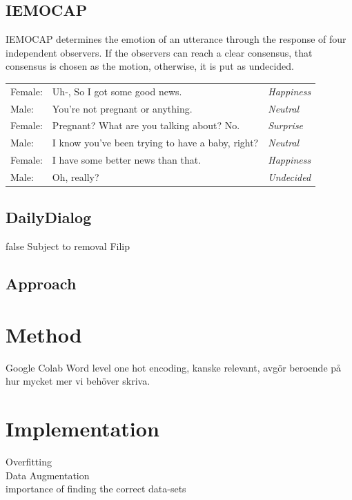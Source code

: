 \documentclass[nofilelist]{cslthse-msc}
\begin{document}
\subsection{IEMOCAP}
IEMOCAP determines the emotion of an utterance through the response of four independent observers. If the observers can reach a clear consensus, that consensus is chosen as the motion, otherwise, it is put as undecided. 

\begin{table}[!ht]
    \begin{pag}

    \centering
    \begin{tabular}{lll}
Female: & Uh-, So I got some good news. & \textit{Happiness} \\
Male: & You're not pregnant or anything. & \textit{Neutral} \\
Female: & Pregnant? What are you talking about? No. & \textit{Surprise} \\
Male: & I know you've been trying to have a baby, right? & \textit{Neutral} \\
Female: & I have some better news than that. & \textit{Happiness} \\
Male: & Oh, really? & \textit{Undecided} \\
    \end{tabular}
    \label{tab:dialogue_iemocap}
\end{pag}
\end{table}


\subsection{DailyDialog}







\ifx false
Subject to removal
Filip
\subsection{Approach} 
\section{Method}
Google Colab
Word level one hot encoding, kanske relevant, avgör beroende på hur mycket mer vi behöver skriva.
\section{Implementation}
Overfitting \\
Data Augmentation \\
importance of finding the correct data-sets \\
\end{document}

